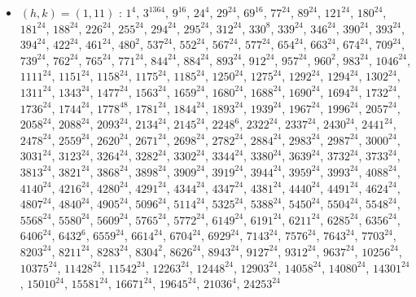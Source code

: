 \begin{itemize}
\item $(h,k)=(1,11)$ : $1^{4}$, $3^{1364}$, $9^{16}$, $24^{4}$, $29^{24}$, $69^{16}$, $77^{24}$, $89^{24}$, $121^{24}$, $180^{24}$, $181^{24}$, $188^{24}$, $226^{24}$, $255^{24}$, $294^{24}$, $295^{24}$, $312^{24}$, $330^{8}$, $339^{24}$, $346^{24}$, $390^{24}$, $393^{24}$, $394^{24}$, $422^{24}$, $461^{24}$, $480^{2}$, $537^{24}$, $552^{24}$, $567^{24}$, $577^{24}$, $654^{24}$, $663^{24}$, $674^{24}$, $709^{24}$, $739^{24}$, $762^{24}$, $765^{24}$, $771^{24}$, $844^{24}$, $884^{24}$, $893^{24}$, $912^{24}$, $957^{24}$, $960^{2}$, $983^{24}$, $1046^{24}$, $1111^{24}$, $1151^{24}$, $1158^{24}$, $1175^{24}$, $1185^{24}$, $1250^{24}$, $1275^{24}$, $1292^{24}$, $1294^{24}$, $1302^{24}$, $1311^{24}$, $1343^{24}$, $1477^{24}$, $1563^{24}$, $1659^{24}$, $1680^{24}$, $1688^{24}$, $1690^{24}$, $1694^{24}$, $1732^{24}$, $1736^{24}$, $1744^{24}$, $1778^{48}$, $1781^{24}$, $1844^{24}$, $1893^{24}$, $1939^{24}$, $1967^{24}$, $1996^{24}$, $2057^{24}$, $2058^{24}$, $2088^{24}$, $2093^{24}$, $2134^{24}$, $2145^{24}$, $2248^{6}$, $2322^{24}$, $2337^{24}$, $2430^{24}$, $2441^{24}$, $2478^{24}$, $2559^{24}$, $2620^{24}$, $2671^{24}$, $2698^{24}$, $2782^{24}$, $2884^{24}$, $2983^{24}$, $2987^{24}$, $3000^{24}$, $3031^{24}$, $3123^{24}$, $3264^{24}$, $3282^{24}$, $3302^{24}$, $3344^{24}$, $3380^{24}$, $3639^{24}$, $3732^{24}$, $3733^{24}$, $3813^{24}$, $3821^{24}$, $3868^{24}$, $3898^{24}$, $3909^{24}$, $3919^{24}$, $3944^{24}$, $3959^{24}$, $3993^{24}$, $4088^{24}$, $4140^{24}$, $4216^{24}$, $4280^{24}$, $4291^{24}$, $4344^{24}$, $4347^{24}$, $4381^{24}$, $4440^{24}$, $4491^{24}$, $4624^{24}$, $4807^{24}$, $4840^{24}$, $4905^{24}$, $5096^{24}$, $5114^{24}$, $5325^{24}$, $5388^{24}$, $5450^{24}$, $5504^{24}$, $5548^{24}$, $5568^{24}$, $5580^{24}$, $5609^{24}$, $5765^{24}$, $5772^{24}$, $6149^{24}$, $6191^{24}$, $6211^{24}$, $6285^{24}$, $6356^{24}$, $6406^{24}$, $6432^{6}$, $6559^{24}$, $6614^{24}$, $6704^{24}$, $6929^{24}$, $7143^{24}$, $7576^{24}$, $7643^{24}$, $7703^{24}$, $8203^{24}$, $8211^{24}$, $8283^{24}$, $8304^{2}$, $8626^{24}$, $8943^{24}$, $9127^{24}$, $9312^{24}$, $9637^{24}$, $10256^{24}$, $10375^{24}$, $11428^{24}$, $11542^{24}$, $12263^{24}$, $12448^{24}$, $12903^{24}$, $14058^{24}$, $14080^{24}$, $14301^{24}$, $15010^{24}$, $15581^{24}$, $16671^{24}$, $19645^{24}$, $21036^{4}$, $24253^{24}$

\end{itemize}
